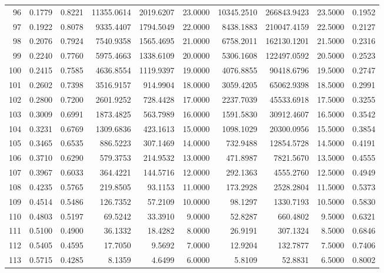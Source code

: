 \documentclass[11pt]{article}
\begin{document}
\begin{tabular}{|r|r|r|r|r|r|r|r|r|r|}
96 & 0.1779 & 0.8221 &  11355.0614 & 2019.6207 &  23.0000 & 10345.2510 &   266843.9423 &  23.5000 & 0.1952 \\
97 & 0.1922 & 0.8078 &   9335.4407 & 1794.5049 &  22.0000 &  8438.1883 &   210047.4159 &  22.5000 & 0.2127 \\
98 & 0.2076 & 0.7924 &   7540.9358 & 1565.4695 &  21.0000 &  6758.2011 &   162130.1201 &  21.5000 & 0.2316 \\
99 & 0.2240 & 0.7760 &   5975.4663 & 1338.6109 &  20.0000 &  5306.1608 &   122497.0592 &  20.5000 & 0.2523 \\
100 & 0.2415 & 0.7585 &   4636.8554 & 1119.9397 &  19.0000 &  4076.8855 &    90418.6796 &  19.5000 & 0.2747 \\
101 & 0.2602 & 0.7398 &   3516.9157 &  914.9904 &  18.0000 &  3059.4205 &    65062.9398 &  18.5000 & 0.2991 \\
102 & 0.2800 & 0.7200 &   2601.9252 &  728.4428 &  17.0000 &  2237.7039 &    45533.6918 &  17.5000 & 0.3255 \\
103 & 0.3009 & 0.6991 &   1873.4825 &  563.7989 &  16.0000 &  1591.5830 &    30912.4607 &  16.5000 & 0.3542 \\
104 & 0.3231 & 0.6769 &   1309.6836 &  423.1613 &  15.0000 &  1098.1029 &    20300.0956 &  15.5000 & 0.3854 \\
105 & 0.3465 & 0.6535 &    886.5223 &  307.1469 &  14.0000 &   732.9488 &    12854.5728 &  14.5000 & 0.4191 \\
106 & 0.3710 & 0.6290 &    579.3753 &  214.9532 &  13.0000 &   471.8987 &     7821.5670 &  13.5000 & 0.4555 \\
107 & 0.3967 & 0.6033 &    364.4221 &  144.5716 &  12.0000 &   292.1363 &     4555.2760 &  12.5000 & 0.4949 \\
108 & 0.4235 & 0.5765 &    219.8505 &   93.1153 &  11.0000 &   173.2928 &     2528.2804 &  11.5000 & 0.5373 \\
109 & 0.4514 & 0.5486 &    126.7352 &   57.2109 &  10.0000 &    98.1297 &     1330.7193 &  10.5000 & 0.5830 \\
110 & 0.4803 & 0.5197 &     69.5242 &   33.3910 &   9.0000 &    52.8287 &      660.4802 &   9.5000 & 0.6321 \\
111 & 0.5100 & 0.4900 &     36.1332 &   18.4282 &   8.0000 &    26.9191 &      307.1324 &   8.5000 & 0.6846 \\
112 & 0.5405 & 0.4595 &     17.7050 &    9.5692 &   7.0000 &    12.9204 &      132.7877 &   7.5000 & 0.7406 \\
113 & 0.5715 & 0.4285 &      8.1359 &    4.6499 &   6.0000 &     5.8109 &       52.8831 &   6.5000 & 0.8002 \\

\end{tabular}
\end{document}

